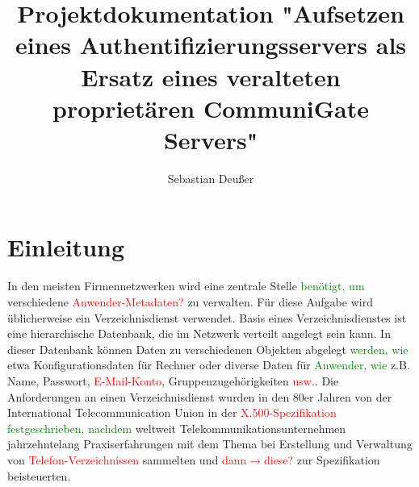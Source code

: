 \documentclass[11pt,a4paper,titlepage=firstiscover]{scrartcl} %
\title{Projektdokumentation "Aufsetzen eines Authentifizierungsservers als Ersatz eines veralteten proprietären CommuniGate Servers"}
\author{Sebastian Deußer}
\begin{document}
\maketitle %

\pagestyle{fancy}
\lhead{}
\chead{\leftmark}
\rhead{}
\cfoot{}

\newcommand{\tcr}[1]{\textcolor{red}{#1}}
\newcommand{\tcg}[1]{\textcolor{green}{#1}}

\thispagestyle{empty}
\tableofcontents
\newpage
\thispagestyle{fancy}
\setcounter{page}{1}  %

\section{Einleitung}
In den meisten Firmennetzwerken wird eine zentrale Stelle \tcg{benötigt, um } 
verschiedene \tcr{Anwender-Metadaten?} zu verwalten. Für diese Aufgabe wird 
üblicherweise ein Verzeichnisdienst verwendet. Basis eines Verzeichnisdienstes 
ist eine hierarchische Datenbank, die im Netzwerk verteilt angelegt sein kann. 
In dieser Datenbank können Daten zu verschiedenen Objekten abgelegt \tcg{werden, 
wie} etwa Konfigurationsdaten für Rechner oder diverse Daten für \tcg{Anwender, 
wie} z.B. Name, Passwort, \tcr{E-Mail-Konto}, Gruppenzugehörigkeiten \tcr{usw.}. 
Die Anforderungen an einen Verzeichnisdienst wurden in den 80er Jahren von der 
International Telecommunication Union in der \tcr{X.500-Spezifikation} 
\tcg{festgeschrieben, nachdem} weltweit Telekommunikationsunternehmen 
jahrzehntelang Praxiserfahrungen mit dem Thema bei Erstellung und Verwaltung 
von \tcr{Telefon-Verzeichnissen} sammelten und \tcr{dann$\to$diese?} zur 
Spezifikation beisteuerten.
\end{document}
